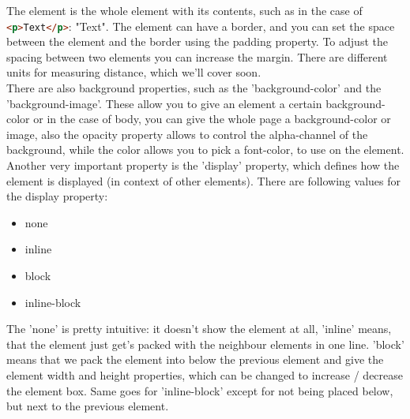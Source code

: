\documentclass[a4paper,12pt]{article}
\newcommand{\htmlelem}[1]{\lstinline[columns=fixed,language=HTML]{#1}}
\newcommand{\nsp}{\vspace{0.05cm}\\}
\begin{document}
The element is the whole element with its contents, such as in the case of \htmlelem{<p>Text</p>}: "Text". The element can have a border, and you can set the space between the element and the border using the padding property. To adjust the spacing between two elements you can increase the margin. There are different units for measuring distance, which we'll cover soon.\nsp
There are also background properties, such as the 'background-color' and the 'background-image'. These allow you to give an element a certain background-color or in the case of body, you can give the whole page a background-color or image, also the opacity property allows to control the alpha-channel of the background, while the color allows you to pick a font-color, to use on the element.\nsp
Another very important property is the 'display' property, which defines how the element is displayed (in context of other elements). There are following values for the display property:
\begin{itemize}
    \item none
    \item inline
    \item block
    \item inline-block
\end{itemize}
The 'none' is pretty intuitive: it doesn't show the element at all, 'inline' means, that the element just get's packed with the neighbour elements in one line. 'block' means that we pack the element into below the previous element and give the element width and height properties, which can be changed to increase / decrease the element box. Same goes for 'inline-block' except for not being placed below, but next to the previous element.
\end{document}
